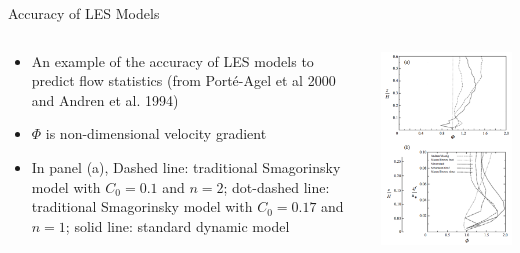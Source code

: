 \begin{frame}{Accuracy of LES Models}
\begin{columns}[T]
    \begin{column}{.45\textwidth}
    \begin{minipage}[c][0.85\textheight][c]{\linewidth}
    \begin{itemize}
	\item An example of the accuracy of LES models to predict flow statistics (from Port\'{e}-Agel et al 2000 and  Andren et al. 1994)
	\item $\Phi$ is non-dimensional velocity gradient
	\item In panel (a), Dashed line: traditional Smagorinsky model with $C_0 = 0.1$ and $n = 2$; dot-dashed line: traditional Smagorinsky model with $C_0 = 0.17$ and $n = 1$; solid line: standard dynamic model
\end{itemize}
      \end{minipage}
    \end{column}
    \begin{column}{.5\textwidth}
      \includegraphics[width=\textwidth]{compare8}

\end{column}
\end{columns}
\end{frame}
